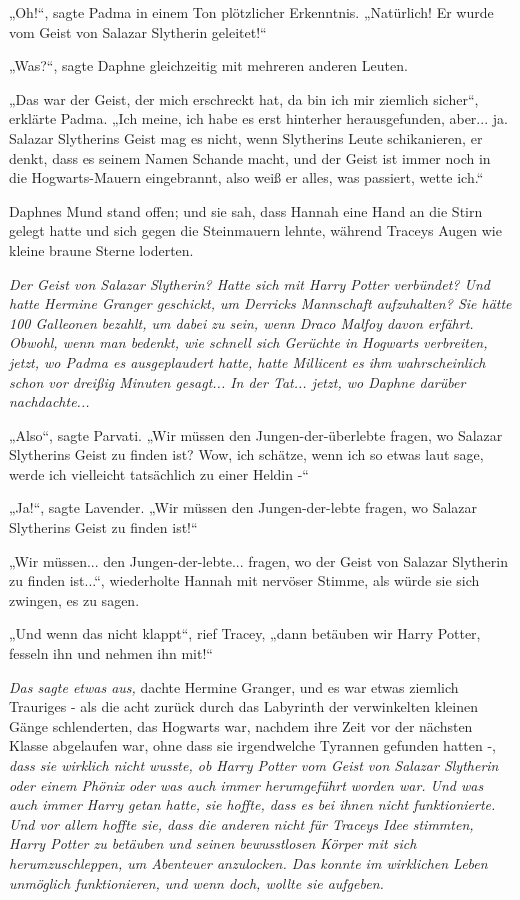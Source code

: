 {„Oh!“, sagte Padma in einem Ton plötzlicher Erkenntnis. „Natürlich! Er wurde vom Geist von Salazar Slytherin geleitet!“

„Was?“, sagte Daphne gleichzeitig mit mehreren anderen Leuten.

„Das war der Geist, der mich erschreckt hat, da bin ich mir ziemlich sicher“, erklärte Padma. „Ich meine, ich habe es erst hinterher herausgefunden, aber... ja. Salazar Slytherins Geist mag es nicht, wenn Slytherins Leute schikanieren, er denkt, dass es seinem Namen Schande macht, und der Geist ist immer noch in die Hogwarts-Mauern eingebrannt, also weiß er alles, was passiert, wette ich.“

Daphnes Mund stand offen; und sie sah, dass Hannah eine Hand an die Stirn gelegt hatte und sich gegen die Steinmauern lehnte, während Traceys Augen wie kleine braune Sterne loderten.

\emph{Der Geist von Salazar Slytherin? Hatte sich mit Harry Potter verbündet? Und hatte Hermine Granger geschickt, um Derricks Mannschaft aufzuhalten? Sie hätte 100 Galleonen bezahlt, um dabei zu sein, wenn Draco Malfoy davon erfährt. Obwohl, wenn man bedenkt, wie schnell sich Gerüchte in Hogwarts verbreiten, jetzt, wo Padma es ausgeplaudert hatte, hatte Millicent es ihm wahrscheinlich schon vor dreißig Minuten gesagt... In der Tat... jetzt, wo Daphne darüber nachdachte...}

„Also“, sagte Parvati. „Wir müssen den Jungen-der-überlebte fragen, wo Salazar Slytherins Geist zu finden ist? Wow, ich schätze, wenn ich so etwas laut sage, werde ich vielleicht tatsächlich zu einer Heldin -“

„Ja!“, sagte Lavender. „Wir müssen den Jungen-der-lebte fragen, wo Salazar Slytherins Geist zu finden ist!“

„Wir müssen... den Jungen-der-lebte... fragen, wo der Geist von Salazar Slytherin zu finden ist...“, wiederholte Hannah mit nervöser Stimme, als würde sie sich zwingen, es zu sagen.

„Und wenn das nicht klappt“, rief Tracey, „dann betäuben wir Harry Potter, fesseln ihn und nehmen ihn mit!“

\emph{Das sagte etwas aus,} dachte Hermine Granger, und es war etwas ziemlich Trauriges - als die acht zurück durch das Labyrinth der verwinkelten kleinen Gänge schlenderten, das Hogwarts war, nachdem ihre Zeit vor der nächsten Klasse abgelaufen war, ohne dass sie irgendwelche Tyrannen gefunden hatten -, \emph{dass sie wirklich nicht wusste, ob Harry Potter vom Geist von Salazar Slytherin oder einem Phönix oder was auch immer herumgeführt worden war. Und was auch immer Harry getan hatte, sie hoffte, dass es bei ihnen nicht funktionierte. Und vor allem hoffte sie, dass die anderen nicht für Traceys Idee stimmten, Harry Potter zu betäuben und seinen bewusstlosen Körper mit sich herumzuschleppen, um Abenteuer anzulocken. Das konnte im wirklichen Leben unmöglich funktionieren, und wenn doch, wollte sie aufgeben.}

}
